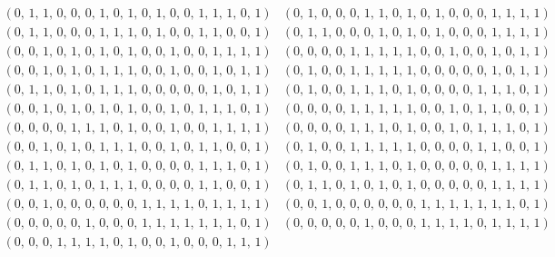 \documentclass[11pt,a4paper,abstract=yes]{scrartcl}
\theoremstyle{plain}
\begin{document}
\begin{mexample}
\begin{tiny}
\begin{displaymath}
\begin{array}{cc}
\left(0,\,1,\,1,\,0,\,0,\,0,\,1,\,0,\,1,\,0,\,1,\,0,\,0,\,1,\,1,\,1,\,0,\,1\right)
 &
\left(0,\,1,\,0,\,0,\,0,\,1,\,1,\,0,\,1,\,0,\,1,\,0,\,0,\,0,\,1,\,1,\,1,\,1\right)
 \\
\left(0,\,1,\,1,\,0,\,0,\,0,\,1,\,1,\,1,\,0,\,1,\,0,\,0,\,1,\,1,\,0,\,0,\,1\right)
 &
\left(0,\,1,\,1,\,0,\,0,\,0,\,1,\,0,\,1,\,0,\,1,\,0,\,0,\,0,\,1,\,1,\,1,\,1\right)
 \\
\left(0,\,0,\,1,\,0,\,1,\,0,\,1,\,0,\,1,\,0,\,0,\,1,\,0,\,0,\,1,\,1,\,1,\,1\right)
 &
\left(0,\,0,\,0,\,0,\,1,\,1,\,1,\,1,\,1,\,0,\,0,\,1,\,0,\,0,\,1,\,0,\,1,\,1\right)
 \\
\left(0,\,0,\,1,\,0,\,1,\,0,\,1,\,1,\,1,\,0,\,0,\,1,\,0,\,0,\,1,\,0,\,1,\,1\right)
 &
\left(0,\,1,\,0,\,0,\,1,\,1,\,1,\,1,\,1,\,0,\,0,\,0,\,0,\,0,\,1,\,0,\,1,\,1\right)
 \\
\left(0,\,1,\,1,\,0,\,1,\,0,\,1,\,1,\,1,\,0,\,0,\,0,\,0,\,0,\,1,\,0,\,1,\,1\right)
 &
\left(0,\,1,\,0,\,0,\,1,\,1,\,1,\,0,\,1,\,0,\,0,\,0,\,0,\,1,\,1,\,1,\,0,\,1\right)
 \\
\left(0,\,0,\,1,\,0,\,1,\,0,\,1,\,0,\,1,\,0,\,0,\,1,\,0,\,1,\,1,\,1,\,0,\,1\right)
 &
\left(0,\,0,\,0,\,0,\,1,\,1,\,1,\,1,\,1,\,0,\,0,\,1,\,0,\,1,\,1,\,0,\,0,\,1\right)
 \\
\left(0,\,0,\,0,\,0,\,1,\,1,\,1,\,0,\,1,\,0,\,0,\,1,\,0,\,0,\,1,\,1,\,1,\,1\right)
 &
\left(0,\,0,\,0,\,0,\,1,\,1,\,1,\,0,\,1,\,0,\,0,\,1,\,0,\,1,\,1,\,1,\,0,\,1\right)
 \\
\left(0,\,0,\,1,\,0,\,1,\,0,\,1,\,1,\,1,\,0,\,0,\,1,\,0,\,1,\,1,\,0,\,0,\,1\right)
 &
\left(0,\,1,\,0,\,0,\,1,\,1,\,1,\,1,\,1,\,0,\,0,\,0,\,0,\,1,\,1,\,0,\,0,\,1\right)
 \\
\left(0,\,1,\,1,\,0,\,1,\,0,\,1,\,0,\,1,\,0,\,0,\,0,\,0,\,1,\,1,\,1,\,0,\,1\right)
 &
\left(0,\,1,\,0,\,0,\,1,\,1,\,1,\,0,\,1,\,0,\,0,\,0,\,0,\,0,\,1,\,1,\,1,\,1\right)
 \\
\left(0,\,1,\,1,\,0,\,1,\,0,\,1,\,1,\,1,\,0,\,0,\,0,\,0,\,1,\,1,\,0,\,0,\,1\right)
 &
\left(0,\,1,\,1,\,0,\,1,\,0,\,1,\,0,\,1,\,0,\,0,\,0,\,0,\,0,\,1,\,1,\,1,\,1\right)
 \\
\left(0,\,0,\,1,\,0,\,0,\,0,\,0,\,0,\,0,\,1,\,1,\,1,\,1,\,0,\,1,\,1,\,1,\,1\right)
 &
\left(0,\,0,\,1,\,0,\,0,\,0,\,0,\,0,\,0,\,1,\,1,\,1,\,1,\,1,\,1,\,1,\,0,\,1\right)
 \\
\left(0,\,0,\,0,\,0,\,0,\,1,\,0,\,0,\,0,\,1,\,1,\,1,\,1,\,1,\,1,\,1,\,0,\,1\right)
 &
\left(0,\,0,\,0,\,0,\,0,\,1,\,0,\,0,\,0,\,1,\,1,\,1,\,1,\,0,\,1,\,1,\,1,\,1\right)
 \\
\left(0,\,0,\,0,\,1,\,1,\,1,\,1,\,0,\,1,\,0,\,0,\,1,\,0,\,0,\,0,\,1,\,1,\,1\right)

\end{array}
\end{displaymath}
\end{tiny}
\end{mexample}
\end{document}
